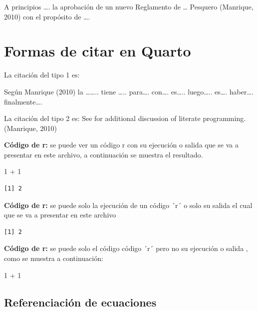 \documentclass[
  12pt,
  letterpaper,
]{scrreprt}
\newenvironment{Shaded}{\begin{snugshade}}{\end{snugshade}}
\newcommand{\DecValTok}[1]{\textcolor[rgb]{0.68,0.00,0.00}{#1}}
\newcommand{\SpecialCharTok}[1]{\textcolor[rgb]{0.37,0.37,0.37}{#1}}
\begin{document}
A principios \ldots. la aprobación de un nuevo Reglamento de \ldots{}
Pesquero (Manrique, 2010) con el propósito de \ldots.


\chapter{Formas de citar en Quarto}\label{formas-de-citar-en-quarto}

La citación del tipo 1 es:

Según Manrique (2010) la \ldots\ldots.. tiene \ldots.. para\ldots.
con\ldots. es\ldots.. luego\ldots.. es\ldots. haber\ldots.
finalmente\ldots.

La citación del tipo 2 es: See for additional discussion of literate
programming.(Manrique, 2010)

\textbf{Código de r:} se puede ver un código r con su ejecución o salida
que se va a presentar en este archivo, a continuación se muestra el
resultado.

\begin{Shaded}
\begin{Highlighting}[]
\DecValTok{1} \SpecialCharTok{+} \DecValTok{1}
\end{Highlighting}
\end{Shaded}

\begin{verbatim}
[1] 2
\end{verbatim}

\textbf{Código de r:} se puede solo la ejecución de un código ´r´ o solo
su salida el cual que se va a presentar en este archivo

\begin{verbatim}
[1] 2
\end{verbatim}

\textbf{Código de r:} se puede solo el código código ´r´ pero no su
ejecución o salida , como se muestra a continuación:

\begin{Shaded}
\begin{Highlighting}[]
\DecValTok{1} \SpecialCharTok{+} \DecValTok{1}
\end{Highlighting}
\end{Shaded}

\section{Referenciación de
ecuaciones}\label{referenciaciuxf3n-de-ecuaciones}
\end{document}
